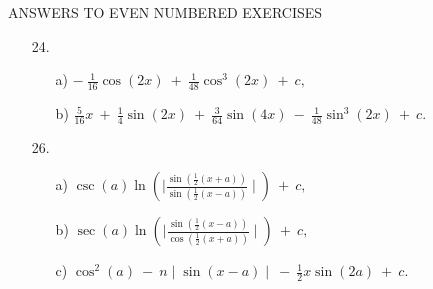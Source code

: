 \documentclass{article}
\begin{document}

\begin{center}
ANSWERS TO EVEN NUMBERED EXERCISES
\end{center}

\begin{enumerate}
    \item [24.]
    \begin{enumerate}
        \item[a)] $
        -\ 
        \frac
            {1}
            {16}
        \cos
            (2x)
        \ +\ 
        \frac
            {1}
            {48}
        \cos^3
            (2x)
        \ +\ 
        c
        ,$
        \item[b)] $
        \frac
            {5}
            {16}
        x
        \ +\ 
        \frac
            {1}
            {4}
        \sin
            (2x)
        \ +\ 
        \frac
            {3}
            {64}
        \sin
            (4x)
        \ -\ 
        \frac
            {1}
            {48}
        \sin^3
            (2x)
        \ +\ 
        c
        .$
    \end{enumerate}
    
    \item[26.]
    \begin{enumerate}
        \item[a)] $
        \csc(a) 
        \ln
            (\mid
                \frac
                    {\sin
                        (\frac
                            {1}
                            {2}
                                (x + a)
                        )
                    }
                    {\sin
                        (\frac
                            {1}
                            {2}
                                (x - a)
                        )
                    }
            \mid)
        \ +\ 
        c
        ,$
        \item[b)] $
        \sec(a) \ln
                    (\mid
                        \frac
                            {\sin
                                (\frac
                                    {1}
                                    {2}
                                        (x - a)
                                )
                            }
                            {\cos
                                (\frac
                                    {1}
                                    {2}
                                        (x + a)
                                )
                            }
                    \mid)
        \ +\ 
        c
        ,$
        \item[c)] $
        \cos^2(a)
        \ -\ 
        n\mid
            \sin
                (x - a)
        \mid
        \ -\ 
        \frac
            {1}
            {2}
        x\sin
            (2a)
        \ +\ 
        c
        .$
    \end{enumerate}
    

\end{enumerate}
\end{document}
